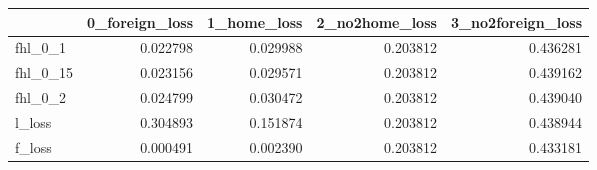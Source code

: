 \begin{tabular}{lrrrr}
\toprule
 & 0_foreign_loss & 1_home_loss & 2_no2home_loss & 3_no2foreign_loss \\
\midrule
fhl_0_1 & 0.022798 & 0.029988 & 0.203812 & 0.436281 \\
fhl_0_15 & 0.023156 & 0.029571 & 0.203812 & 0.439162 \\
fhl_0_2 & 0.024799 & 0.030472 & 0.203812 & 0.439040 \\
l_loss & 0.304893 & 0.151874 & 0.203812 & 0.438944 \\
f_loss & 0.000491 & 0.002390 & 0.203812 & 0.433181 \\
\bottomrule
\end{tabular}
